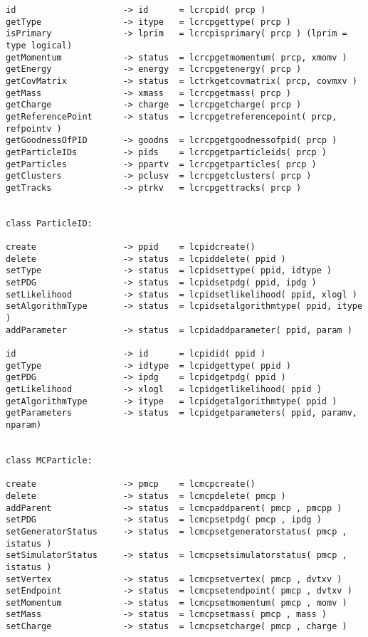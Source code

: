 \begin{scriptsize}
\begin{verbatim}
id                     -> id      = lcrcpid( prcp )
getType                -> itype   = lcrcpgettype( prcp )
isPrimary              -> lprim   = lcrcpisprimary( prcp ) (lprim = type logical)
getMomentum            -> status  = lcrcpgetmomentum( prcp, xmomv )
getEnergy              -> energy  = lcrcpgetenergy( prcp )
getCovMatrix           -> status  = lctrkgetcovmatrix( prcp, covmxv )
getMass                -> xmass   = lcrcpgetmass( prcp )
getCharge              -> charge  = lcrcpgetcharge( prcp )
getReferencePoint      -> status  = lcrcpgetreferencepoint( prcp, refpointv )
getGoodnessOfPID       -> goodns  = lcrcpgetgoodnessofpid( prcp )
getParticleIDs         -> pids    = lcrcpgetparticleids( prcp )
getParticles           -> ppartv  = lcrcpgetparticles( prcp )
getClusters            -> pclusv  = lcrcpgetclusters( prcp )
getTracks              -> ptrkv   = lcrcpgettracks( prcp )


class ParticleID:

create                 -> ppid    = lcpidcreate()
delete                 -> status  = lcpiddelete( ppid )
setType                -> status  = lcpidsettype( ppid, idtype )
setPDG                 -> status  = lcpidsetpdg( ppid, ipdg )
setLikelihood          -> status  = lcpidsetlikelihood( ppid, xlogl )
setAlgorithmType       -> status  = lcpidsetalgorithmtype( ppid, itype )
addParameter           -> status  = lcpidaddparameter( ppid, param )

id                     -> id      = lcpidid( ppid )
getType                -> idtype  = lcpidgettype( ppid )
getPDG                 -> ipdg    = lcpidgetpdg( ppid )
getLikelihood          -> xlogl   = lcpidgetlikelihood( ppid )
getAlgorithmType       -> itype   = lcpidgetalgorithmtype( ppid )
getParameters          -> status  = lcpidgetparameters( ppid, paramv, nparam)


class MCParticle:

create                 -> pmcp    = lcmcpcreate()
delete                 -> status  = lcmcpdelete( pmcp )
addParent              -> status  = lcmcpaddparent( pmcp , pmcpp )
setPDG                 -> status  = lcmcpsetpdg( pmcp , ipdg )
setGeneratorStatus     -> status  = lcmcpsetgeneratorstatus( pmcp , istatus )
setSimulatorStatus     -> status  = lcmcpsetsimulatorstatus( pmcp , istatus )
setVertex              -> status  = lcmcpsetvertex( pmcp , dvtxv )
setEndpoint            -> status  = lcmcpsetendpoint( pmcp , dvtxv )
setMomentum            -> status  = lcmcpsetmomentum( pmcp , momv )
setMass                -> status  = lcmcpsetmass( pmcp , mass )
setCharge              -> status  = lcmcpsetcharge( pmcp , charge )


\end{verbatim}
\end{scriptsize}
